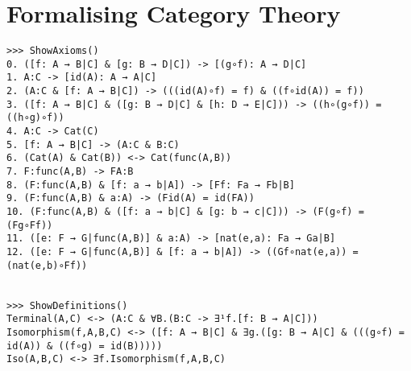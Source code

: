 \documentclass[12pt,leqno]{article}
\numberwithin{equation}{section}
\begin{document}
\section*{Formalising Category Theory}

\begin{verbatim}
>>> ShowAxioms()
0. ([f: A → B|C] & [g: B → D|C]) -> [(g∘f): A → D|C] 
1. A:C -> [id(A): A → A|C] 
2. (A:C & [f: A → B|C]) -> (((id(A)∘f) = f) & ((f∘id(A)) = f)) 
3. ([f: A → B|C] & ([g: B → D|C] & [h: D → E|C])) -> ((h∘(g∘f)) = ((h∘g)∘f)) 
4. A:C -> Cat(C) 
5. [f: A → B|C] -> (A:C & B:C) 
6. (Cat(A) & Cat(B)) <-> Cat(func(A,B)) 
7. F:func(A,B) -> FA:B 
8. (F:func(A,B) & [f: a → b|A]) -> [Ff: Fa → Fb|B] 
9. (F:func(A,B) & a:A) -> (Fid(A) = id(FA)) 
10. (F:func(A,B) & ([f: a → b|C] & [g: b → c|C])) -> (F(g∘f) = (Fg∘Ff)) 
11. ([e: F → G|func(A,B)] & a:A) -> [nat(e,a): Fa → Ga|B] 
12. ([e: F → G|func(A,B)] & [f: a → b|A]) -> ((Gf∘nat(e,a)) = (nat(e,b)∘Ff)) 


>>> ShowDefinitions()
Terminal(A,C) <-> (A:C & ∀B.(B:C -> ∃¹f.[f: B → A|C]))
Isomorphism(f,A,B,C) <-> ([f: A → B|C] & ∃g.([g: B → A|C] & (((g∘f) = id(A)) & ((f∘g) = id(B)))))
Iso(A,B,C) <-> ∃f.Isomorphism(f,A,B,C)


\end{verbatim}
\end{document}
